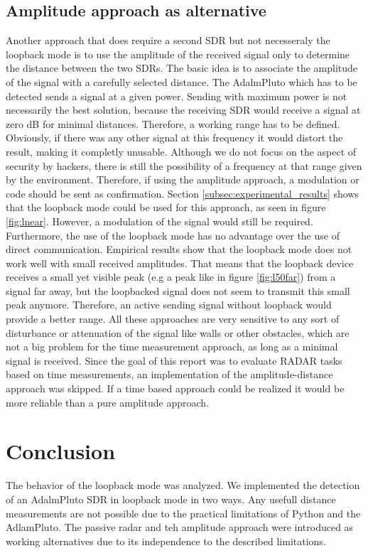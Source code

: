 \documentclass[journal]{IEEEtran}
\begin{document}
\subsection{Amplitude approach as alternative}
\label{sec:Alternatives2}
Another approach that does require a second SDR but not necesseraly the loopback mode is to use the amplitude of the received signal only to determine the distance between the two SDRs.
The basic idea is to associate the amplitude of the signal with a carefully selected distance.
The AdalmPluto which has to be detected sends a signal at a given power. 
Sending with maximum power is not necessarily the best solution, because the receiving SDR would receive a signal at zero dB for minimal distances. 
Therefore, a working range has to be defined.
Obviously, if there was any other signal at this frequency it would distort the result, making it completly unusable.
Although we do not focus on the aspect of security by hackers, there is still the possibility of a frequency at that range given by the environment.
Therefore, if using the amplitude approach, a modulation or code should be sent as confirmation. 
Section \ref{subsec:experimental_results} shows that the loopback mode could be used for this approach, as seen in figure \ref{fig:lnear}.
However, a modulation of the signal would still be required. 
Furthermore, the use of the loopback mode has no advantage over the use of direct communication.
Empirical results show that the loopback mode does not work well with small received amplitudes.
That means that the loopback device receives a small yet visible peak (e.g a peak like in figure \ref{fig:l50far}) from a signal far away, but the loopbacked signal does not seem to transmit this small peak anymore.
Therefore, an active sending signal without loopback would provide a better range.
All these approaches are very sensitive to any sort of disturbance or attenuation of the signal like walls or other obstacles, which are not a big problem for the time measurement approach, as long as a minimal signal is received.
Since the goal of this report was to evaluate RADAR tasks based on time measurements, an implementation of the amplitude-distance approach was skipped.   
If a time based approach could be realized it would be more reliable than a pure amplitude approach. 


\section{Conclusion}
\label{sec:conclusion}
The behavior of the loopback mode was analyzed.
We implemented the detection of an AdalmPluto SDR in loopback mode in two ways.
Any usefull distance measurements are not possible due to the practical limitations of Python and the AdlamPluto.
The passive radar and teh amplitude approach were introduced as working alternatives due to its independence to the described limitations. 




\appendices




\end{document}
